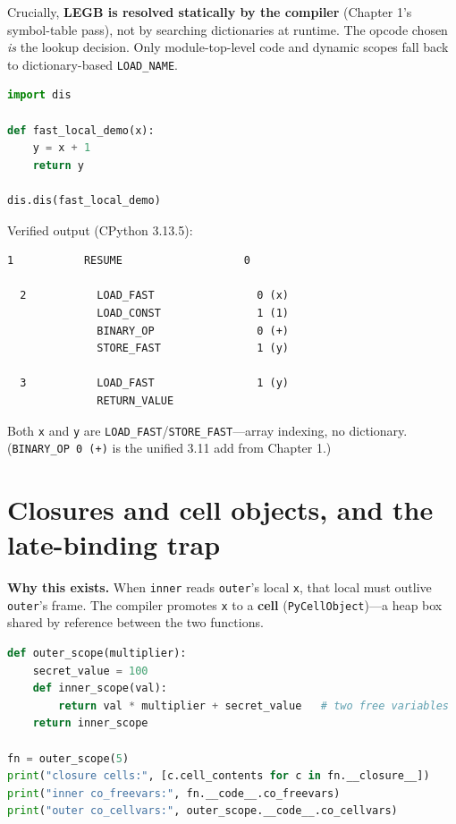 Crucially, \textbf{LEGB is resolved statically by the compiler} (Chapter 1's symbol-table
pass), not by searching dictionaries at runtime. The opcode chosen \emph{is} the lookup
decision. Only module-top-level code and dynamic scopes fall back to dictionary-based
\texttt{LOAD\_NAME}.

\begin{lstlisting}[language=Python, caption={The compiler bakes the scope decision into the opcode.}]
import dis

def fast_local_demo(x):
    y = x + 1
    return y

dis.dis(fast_local_demo)
\end{lstlisting}

Verified output (CPython 3.13.5):

\begin{lstlisting}[caption={Output}]
  1           RESUME                   0

  2           LOAD_FAST                0 (x)
              LOAD_CONST               1 (1)
              BINARY_OP                0 (+)
              STORE_FAST               1 (y)

  3           LOAD_FAST                1 (y)
              RETURN_VALUE
\end{lstlisting}

Both \texttt{x} and \texttt{y} are \texttt{LOAD\_FAST}/\texttt{STORE\_FAST}---array indexing,
no dictionary. (\texttt{BINARY\_OP 0 (+)} is the unified 3.11 add from Chapter 1.)

\section{Closures and cell objects, and the late-binding trap}

\textbf{Why this exists.} When \texttt{inner} reads \texttt{outer}'s local \texttt{x}, that
local must outlive \texttt{outer}'s frame. The compiler promotes \texttt{x} to a \textbf{cell}
(\texttt{PyCellObject})---a heap box shared by reference between the two functions.

\begin{lstlisting}[language=Python, caption={Closure cells are live, shared boxes --- inspectable at runtime.}]
def outer_scope(multiplier):
    secret_value = 100
    def inner_scope(val):
        return val * multiplier + secret_value   # two free variables
    return inner_scope

fn = outer_scope(5)
print("closure cells:", [c.cell_contents for c in fn.__closure__])
print("inner co_freevars:", fn.__code__.co_freevars)
print("outer co_cellvars:", outer_scope.__code__.co_cellvars)
\end{lstlisting}

